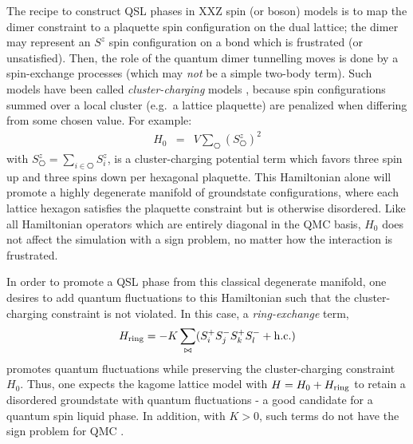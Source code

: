 \documentclass[range]{ar2e}
\begin{document}
The recipe to construct QSL phases in XXZ spin (or boson) models is to map the dimer constraint to a plaquette spin configuration on the dual lattice; the dimer may represent an $S^z$ spin configuration on a bond which is frustrated (or unsatisfied).  Then, the role of the quantum dimer tunnelling moves is done by a spin-exchange processes (which may {\it not} be a simple two-body term).  Such models have been called
{\it cluster-charging} models \cite{Isakov2}, because spin configurations summed over a local cluster (e.g.~a lattice plaquette) are penalized when differing from some chosen value.  For example:
\begin{eqnarray}
H_0 &=& V \sum_{\hexagon} (S^z_{\hexagon})^2 
\end{eqnarray}
with $S^z_{\hexagon} = \sum_{i \in \hexagon}S^z_i$,
is a cluster-charging potential term which favors three spin up and three spins down per hexagonal plaquette.  This Hamiltonian alone will promote a highly degenerate manifold of groundstate configurations, where each lattice hexagon satisfies the plaquette constraint but is otherwise disordered.  
Like all Hamiltonian operators which are entirely diagonal in the QMC basis, $H_0$ does not affect the simulation with a sign problem, no matter how the interaction is frustrated.

In order to promote a QSL phase from this classical degenerate manifold, one desires to add quantum fluctuations to this Hamiltonian such that the cluster-charging constraint is not violated.  In this case, a {\it ring-exchange} term, 
\begin{eqnarray}
H_{\rm ring} = -K \sum_{\bowtie} ( S_i^{+} S_j^{-} S_k^{+} S_l^{-} + {\rm h.c.} )
\end{eqnarray} 
promotes quantum fluctuations while preserving the cluster-charging constraint $H_0$.  Thus, one expects the kagome lattice model with $H = H_0 + H_{\rm ring}$ to retain a disordered groundstate with quantum fluctuations - a good candidate for a quantum spin liquid phase.  In addition, with $K>0$, such terms do not have the sign problem for QMC \cite{JKqmc}.
\end{document}
